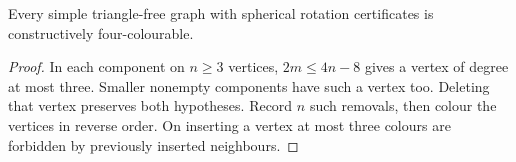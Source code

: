 \begin{corollary}\leavevmode\label{idx:plane-four-colours-for-triangle-free-spherical-graphs}
Every simple triangle-free graph with spherical rotation certificates is
constructively four-colourable.
\end{corollary}
\begin{proof}
In each component on $n\ge3$ vertices, $2m\le 4n-8$ gives a vertex of
degree at most three. Smaller nonempty components have such a vertex too.
Deleting that vertex preserves both hypotheses. Record $n$ such removals,
then colour the vertices in reverse order. On inserting a vertex at most
three colours are forbidden by previously inserted neighbours.
\end{proof}
